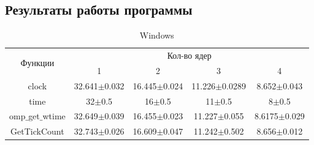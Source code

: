 \documentclass{article}
\begin{document}
		\begin{figure}[h!]
			\label{ris:VirtualBox_processors}
		\end{figure}
		
		\newpage
					
		\subsection{Результаты работы программы}

		\begin{table}[h!]
		\caption{Windows}
			\begin{tabular}{|c|c|c|c|c|}
			\hline			
			\multirow{2}{*}{Функции} & \multicolumn{4}{|c|}{ Кол-во ядер }\\
			\cline{2-5}
			\qquad 	&  1 & 2  &  3 &  4  \\
			\cline{2-5}
			\hline			
			clock		&32.641$\pm$0.032	& 16.445$\pm$0.024	&	11.226$\pm$0.0289	&	8.652$\pm$0.043		\\
			\hline
			time	&	32$\pm$0.5	&	16$\pm$0.5 &	11$\pm$0.5	&	8$\pm$0.5		\\
			\hline
			omp$\_$get$\_$wtime	&	32.649$\pm$0.039	&	16.455$\pm$0.023	&	11.227$\pm$0.055	&	8.6175$\pm$0.029\\
			\hline
			GetTickCount	&	32.743$\pm$0.026		&	16.609$\pm$0.047	&	11.242$\pm$0.502	&	8.656$\pm$0.012	\\
			\hline
			\end{tabular}
		\end{table}
		
\end{document}

